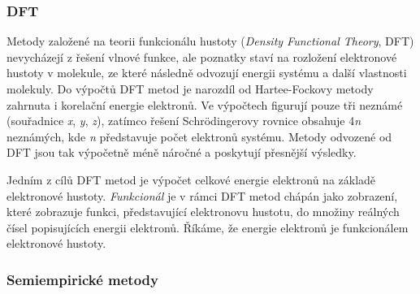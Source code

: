 

\subsubsection{DFT}
Metody založené na teorii funkcionálu hustoty (\textit{Density Functional Theory}, DFT) nevycházejí z řešení vlnové funkce, ale  poznatky staví na rozložení elektronové hustoty v molekule, ze které následně odvozují energii systému a další vlastnosti molekuly. Do výpočtů DFT metod je narozdíl od Hartee-Fockovy metody zahrnuta i korelační energie elektronů. Ve výpočtech figurují pouze tři neznámé (souřadnice \textit{x}, \textit{y}, \textit{z}), zatímco řešení Schrödingerovy rovnice obsahuje 4\textit{n} neznámých, kde \textit{n} představuje počet elektronů systému. Metody odvozené od DFT jsou tak výpočetně méně náročné a poskytují přesnější výsledky.

Jedním z cílů DFT metod je výpočet celkové energie elektronů na základě elektronové hustoty.\textit{ Funkcionál} je v rámci DFT metod chápán jako zobrazení, které zobrazuje funkci, představující elektronovu hustotu, do množiny reálných čísel popisujících energii elektronů. Říkáme, že energie elektronů je funkcionálem elektronové hustoty. %
\subsubsection{Semiempirické metody}

